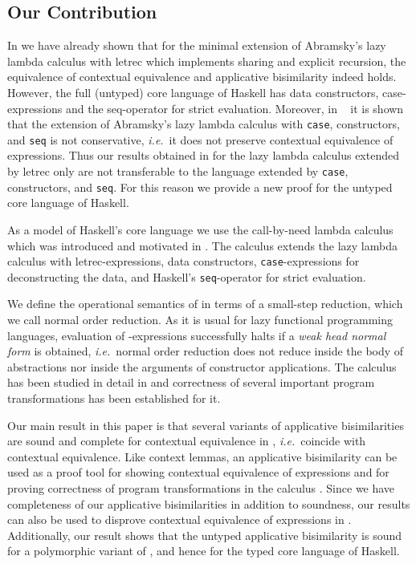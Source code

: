 \documentclass{LMCS}
\theoremstyle{plain}
\theoremstyle{definition}
\newcommand{\ie}{{\em i.e.}}
\newcommand{\tcase}{{\tt case}}
\newcommand{\tseq}{{\tt seq}}
\begin{document}
\subsection*{Our Contribution}
In \cite{schmidt-schauss-sabel-machkasova-rta:10} we have already shown that
for the minimal extension of Abramsky's lazy lambda calculus with letrec which
implements sharing and explicit recursion, the equivalence of contextual
equivalence and applicative bisimilarity indeed holds. 
However, the full (untyped) core language of Haskell has data constructors, 
case-expressions and the seq-operator for strict evaluation. 
Moreover, in ~\cite{schmidt-schauss-machkasova-sabel:rta:2013} it is shown that
the extension of Abramsky's lazy lambda calculus with \tcase{}, constructors, 
and \tseq{} is not conservative, \ie\ it does not preserve contextual 
equivalence of expressions. 
Thus our results obtained in \cite{schmidt-schauss-sabel-machkasova-rta:10} for
the lazy lambda calculus extended by letrec only are not transferable to the
language extended by \tcase{}, constructors, and \tseq.
For this reason we provide a new proof for the untyped core language of Haskell.

As a model of  Haskell's core language we use the call-by-need lambda calculus
 which was introduced and motivated in 
\cite{schmidt-schauss-schuetz-sabel:08}. 
The calculus  extends the lazy lambda calculus with letrec-expressions, 
data constructors, \tcase-expressions for deconstructing the data, and 
Haskell's \tseq-operator for strict evaluation.

We define the operational semantics of  in terms of a small-step 
reduction, which we call normal order reduction.
As it is usual for lazy functional programming languages, evaluation of 
-expressions successfully halts if a {\em weak head normal form} is 
obtained, \ie\ normal order reduction does not reduce inside the body of
abstractions nor inside the arguments of constructor applications.
The  calculus has been studied in detail in 
\cite{schmidt-schauss-schuetz-sabel:08} and correctness of several important
program transformations has been established for it.

Our main result in this paper is that several variants of applicative 
bisimilarities are sound and complete for contextual equivalence in ,
\ie\ coincide with contextual equivalence. 
Like context lemmas, an applicative bisimilarity can be used as a proof tool
for showing contextual equivalence of expressions and for proving correctness
of program transformations in the calculus . 
Since we have completeness of our applicative bisimilarities in addition to
soundness, our results can also be used to disprove contextual equivalence of
expressions in .
Additionally, our result shows that the untyped applicative bisimilarity is
sound for a polymorphic variant of , and hence for the typed core 
language of Haskell. 
\end{document}
